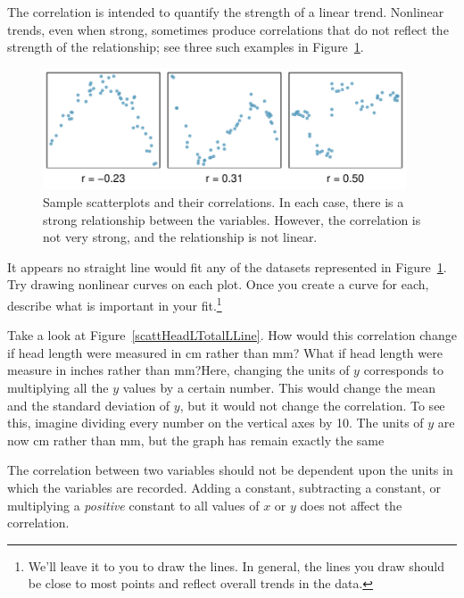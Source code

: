 The correlation is intended to quantify the strength of a linear trend. Nonlinear trends, even when strong, sometimes produce correlations that do not reflect the strength of the relationship; see three such examples in Figure~\ref{corForNonLinearPlots}.

\begin{figure}
   \centering
   \includegraphics[width=0.96\textwidth]{ch_regr_simple_linear/figures/posNegCorPlots/corForNonLinearPlots}
   \caption{Sample scatterplots and their correlations. In each case, there is a strong relationship between the variables. However, the correlation is not very strong, and the relationship is not linear.}
   \label{corForNonLinearPlots}
\end{figure}

\begin{exercise}
It appears no straight line would fit any of the datasets represented in Figure~\ref{corForNonLinearPlots}. Try drawing nonlinear curves on each plot. Once you create a curve for each, describe what is important in your fit.\footnote{We'll leave it to you to draw the lines. In general, the lines you draw should be close to most points and reflect overall trends in the data.}
\end{exercise}

\begin{example}
{Take a look at Figure~\ref{scattHeadLTotalLLine}.  How would this correlation change if head length were measured in cm rather than mm?  What if head length were measure in inches rather than mm?}Here, changing the units of $y$ corresponds to multiplying all the $y$ values by a certain number.  This would change the mean and the standard deviation of $y$, but it would not change the correlation.  To see this, imagine dividing every number on the vertical axes by 10.  The units of $y$ are now cm rather than mm, but the graph has remain exactly the same
\end{example}

\begin{termBox}{
The correlation between two variables should not be dependent upon the units in which the variables are recorded.  Adding a constant, subtracting a constant, or multiplying a \emph{positive} constant to all values of $x$ or $y$ does not affect the \mbox{correlation.}}
\end{termBox}


